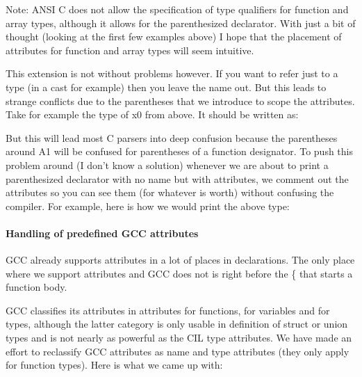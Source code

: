 \documentclass[letterpaper]{article}
\begin{document}
 Note: ANSI C does not allow the specification of type qualifiers for function
and array types, although it allows for the parenthesized declarator. With
just a bit of thought (looking at the first few examples above) I hope that
the placement of attributes for function and array types will seem intuitive.

 This extension is not without problems however. If you want to refer just to
a type (in a cast for example) then you leave the name out. But this leads to
strange conflicts due to the parentheses that we introduce to scope the
attributes. Take for example the type of x0 from above. It should be written
as:


 But this will lead most C parsers into deep confusion because the parentheses
around A1 will be confused for parentheses of a function designator. To push
this problem around (I don't know a solution) whenever we are about to print a
parenthesized declarator with no name but with attributes, we comment out the
attributes so you can see them (for whatever is worth) without confusing the
compiler. For example, here is how we would print the above type:


 \paragraph{Handling of predefined GCC attributes}

 GCC already supports attributes in a lot of places in declarations. The only
place where we support attributes and GCC does not is right before the \{ that
starts a function body.

 GCC classifies its attributes in attributes for functions, for variables and
for types, although the latter category is only usable in definition of struct
or union types and is not nearly as powerful as the CIL type attributes. We
have made an effort to reclassify GCC attributes as name and type attributes
(they only apply for function types). Here is what we came up with:
\end{document}
